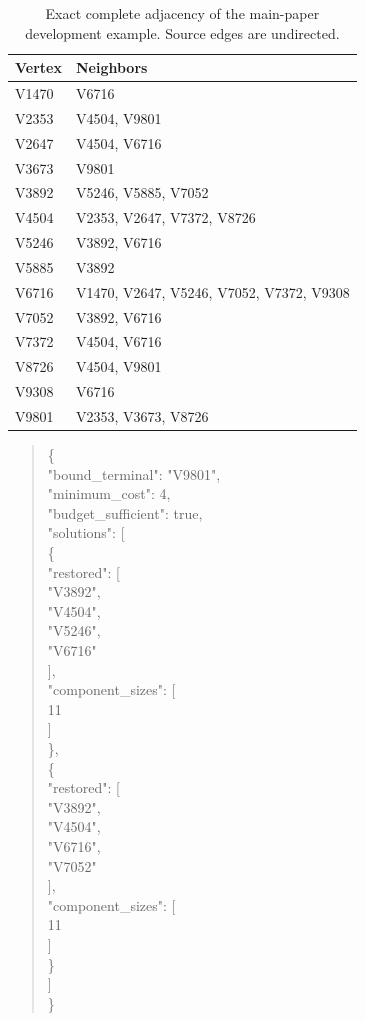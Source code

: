 \begin{table}[t]
\centering\small
\caption{Exact complete adjacency of the main-paper development example. Source edges are undirected.}
\begin{tabular}{@{}ll@{}}
\toprule
Vertex & Neighbors\\
\midrule
V1470 & V6716\\
V2353 & V4504, V9801\\
V2647 & V4504, V6716\\
V3673 & V9801\\
V3892 & V5246, V5885, V7052\\
V4504 & V2353, V2647, V7372, V8726\\
V5246 & V3892, V6716\\
V5885 & V3892\\
V6716 & V1470, V2647, V5246, V7052, V7372, V9308\\
V7052 & V3892, V6716\\
V7372 & V4504, V6716\\
V8726 & V4504, V9801\\
V9308 & V6716\\
V9801 & V2353, V3673, V8726\\
\bottomrule
\end{tabular}

\end{table}
\begin{quote}\small\ttfamily
\{\\
  "bound\_terminal": "V9801",\\
  "minimum\_cost": 4,\\
  "budget\_sufficient": true,\\
  "solutions": [\\
    \{\\
      "restored": [\\
        "V3892",\\
        "V4504",\\
        "V5246",\\
        "V6716"\\
      ],\\
      "component\_sizes": [\\
        11\\
      ]\\
    \},\\
    \{\\
      "restored": [\\
        "V3892",\\
        "V4504",\\
        "V6716",\\
        "V7052"\\
      ],\\
      "component\_sizes": [\\
        11\\
      ]\\
    \}\\
  ]\\
\}\\
\end{quote}
